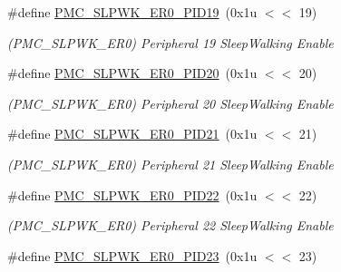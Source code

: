 \begin{DoxyCompactItemize}
\mbox{\label{group__SAMV71__PMC_gab43119eba8c2f4ab723c00849169523f}} 
\#define \mbox{\hyperlink{group__SAMV71__PMC_gab43119eba8c2f4ab723c00849169523f}{P\+M\+C\+\_\+\+S\+L\+P\+W\+K\+\_\+\+E\+R0\+\_\+\+P\+I\+D19}}~(0x1u $<$$<$ 19)
\begin{DoxyCompactList}\small\item\em (P\+M\+C\+\_\+\+S\+L\+P\+W\+K\+\_\+\+E\+R0) Peripheral 19 Sleep\+Walking Enable \end{DoxyCompactList}\item 
\mbox{\label{group__SAMV71__PMC_gab09575cb5cad6e76033ba550f6eba4cf}} 
\#define \mbox{\hyperlink{group__SAMV71__PMC_gab09575cb5cad6e76033ba550f6eba4cf}{P\+M\+C\+\_\+\+S\+L\+P\+W\+K\+\_\+\+E\+R0\+\_\+\+P\+I\+D20}}~(0x1u $<$$<$ 20)
\begin{DoxyCompactList}\small\item\em (P\+M\+C\+\_\+\+S\+L\+P\+W\+K\+\_\+\+E\+R0) Peripheral 20 Sleep\+Walking Enable \end{DoxyCompactList}\item 
\mbox{\label{group__SAMV71__PMC_ga6018bba1ff61d49b66340adeb558032c}} 
\#define \mbox{\hyperlink{group__SAMV71__PMC_ga6018bba1ff61d49b66340adeb558032c}{P\+M\+C\+\_\+\+S\+L\+P\+W\+K\+\_\+\+E\+R0\+\_\+\+P\+I\+D21}}~(0x1u $<$$<$ 21)
\begin{DoxyCompactList}\small\item\em (P\+M\+C\+\_\+\+S\+L\+P\+W\+K\+\_\+\+E\+R0) Peripheral 21 Sleep\+Walking Enable \end{DoxyCompactList}\item 
\mbox{\label{group__SAMV71__PMC_ga8ea037282e75cc5c046a45f91d309049}} 
\#define \mbox{\hyperlink{group__SAMV71__PMC_ga8ea037282e75cc5c046a45f91d309049}{P\+M\+C\+\_\+\+S\+L\+P\+W\+K\+\_\+\+E\+R0\+\_\+\+P\+I\+D22}}~(0x1u $<$$<$ 22)
\begin{DoxyCompactList}\small\item\em (P\+M\+C\+\_\+\+S\+L\+P\+W\+K\+\_\+\+E\+R0) Peripheral 22 Sleep\+Walking Enable \end{DoxyCompactList}\item 
\mbox{\label{group__SAMV71__PMC_gae947d98d4be38826f4eaeab7c87c417d}} 
\#define \mbox{\hyperlink{group__SAMV71__PMC_gae947d98d4be38826f4eaeab7c87c417d}{P\+M\+C\+\_\+\+S\+L\+P\+W\+K\+\_\+\+E\+R0\+\_\+\+P\+I\+D23}}~(0x1u $<$$<$ 23)
$$
\end{DoxyCompactItemize}
